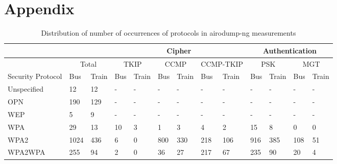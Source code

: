 \documentclass[letterpaper, 10 pt, conference]{ieeeconf}  %
\begin{document}
\section{Appendix}
\begin{center}
  \begin{table}[t]    
   \centering
    \begin{tabular}{ |l|l|l|l|l|l|l|l|l|l|l|l|l| }
    \hline    
    {} & \multicolumn{2}{|c|}{} & \multicolumn{6}{|c|}{Cipher} & \multicolumn{4}{|c|}{Authentication} \\ \hline
    {} & \multicolumn{2}{|c|}{Total} & \multicolumn{2}{|c|}{TKIP} & \multicolumn{2}{|c|}{CCMP} & \multicolumn{2}{|c|}{CCMP-TKIP} & \multicolumn{2}{|c|}{PSK} & \multicolumn{2}{|c|}{MGT} \\ \hline
    Security Protocol & Bus & Train& Bus & Train & Bus & Train & Bus & Train & Bus & Train & Bus & Train \\ \hline
    Unspecified & 12 & 12 & - & - & - & - & - & - & - & - & - & - \\ \hline
    OPN & 190 & 129 & - & - & - & - & - & - & - & - & - & - \\ \hline
    WEP & 5 & 9 & - & - & - & - & - & - & - & - & - & - \\ \hline    
    WPA & 29 & 13 & 10 & 3 & 1 & 3 & 4 & 2 & 15 & 8 & 0 & 0 \\ \hline
    WPA2 & 1024 & 436 & 6 & 0 & 800 & 330 & 218 & 106 & 916 & 385 & 108 & 51 \\ \hline
    WPA2WPA & 255 & 94 & 2 & 0 & 36 & 27 & 217 & 67 & 235 & 90 & 20 & 4 \\ \hline
    \end{tabular}
    \caption{Distribution of number of occurrences of protocols in airodump-ng measurements}
    \label{tab:measurements}
  \end{table}
\end{center}


\addtolength{\textheight}{-12cm}   %

\end{document}

